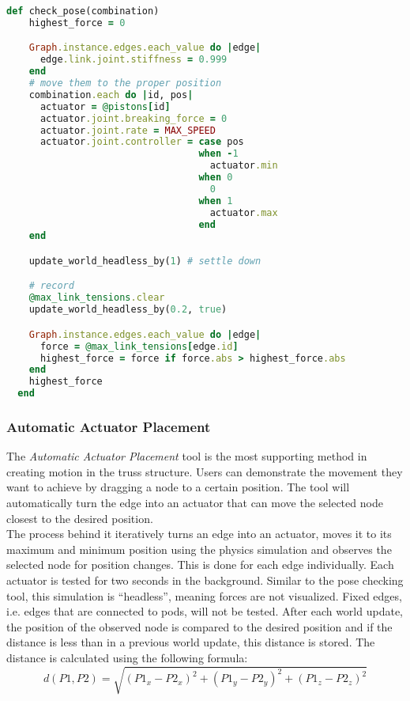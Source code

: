 \begin{lstlisting}[language=Ruby, label={lst:pose_check}, caption=The stability check algorithm.]
  def check_pose(combination)
    highest_force = 0

    Graph.instance.edges.each_value do |edge|
      edge.link.joint.stiffness = 0.999
    end
    # move them to the proper position
    combination.each do |id, pos|
      actuator = @pistons[id]
      actuator.joint.breaking_force = 0
      actuator.joint.rate = MAX_SPEED
      actuator.joint.controller = case pos
                                  when -1
                                    actuator.min
                                  when 0
                                    0
                                  when 1
                                    actuator.max
                                  end
    end

    update_world_headless_by(1) # settle down

    # record
    @max_link_tensions.clear
    update_world_headless_by(0.2, true)

    Graph.instance.edges.each_value do |edge|
      force = @max_link_tensions[edge.id]
      highest_force = force if force.abs > highest_force.abs
    end
    highest_force
  end
\end{lstlisting}

\subsubsection{Automatic Actuator Placement}
The \textit{Automatic Actuator Placement} tool is the most supporting method in creating motion in the truss structure. Users can demonstrate the movement they want to achieve by dragging a node to a certain position. The tool will automatically turn the edge into an actuator that can move the selected node closest to the desired position.\\
The process behind it iteratively turns an edge into an actuator, moves it to its maximum and minimum position using the physics simulation and observes the selected node for position changes. This is done for each edge individually. Each actuator is tested for two seconds in the background. Similar to the pose checking tool, this simulation is ``headless'', meaning forces are not visualized. Fixed edges, i.e. edges that are connected to pods, will not be tested. After each world update, the position of the observed node is compared to the desired position and if the distance is less than in a previous world update, this distance is stored. The distance is calculated using the following formula:
\begin{equation}
  d(P1, P2) = \sqrt{(P1_x - P2_x)^2 + (P1_y - P2_y)^2 + (P1_z - P2_z)^2}
\end{equation}

